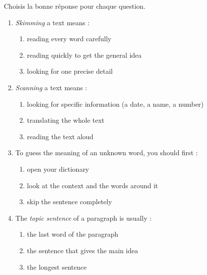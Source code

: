 \documentclass[11pt]{article}
\begin{document}
\begin{exercice}
Choisis la bonne réponse pour chaque question.
\begin{enumerate}
\item \emph{Skimming} a text means :
\begin{enumerate}
\item reading every word carefully
\item reading quickly to get the general idea
\item looking for one precise detail
\end{enumerate}
\item \emph{Scanning} a text means :
\begin{enumerate}
\item looking for specific information (a date, a name, a number)
\item translating the whole text
\item reading the text aloud
\end{enumerate}
\item To guess the meaning of an unknown word, you should first :
\begin{enumerate}
\item open your dictionary
\item look at the context and the words around it
\item skip the sentence completely
\end{enumerate}
\item The \emph{topic sentence} of a paragraph is usually :
\begin{enumerate}
\item the last word of the paragraph
\item the sentence that gives the main idea
\item the longest sentence
\end{enumerate}
\end{enumerate}
\end{exercice}
\end{document}
